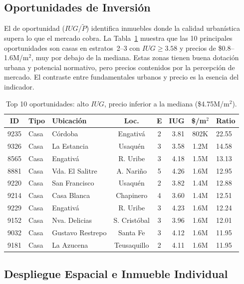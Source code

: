 \documentclass[12pt, a4paper, twoside, openright]{report}
\theoremstyle{plain}
\theoremstyle{definition}
\newcommand{\IUG}{IUG}             %
\begin{document}
\subsection{Oportunidades de Inversión}

El \ratio{} de oportunidad ($\IUG / \tilde{P}$) identifica inmuebles donde la calidad urbanística supera lo que el mercado cobra. La Tabla~\ref{tab:oportunidades_res} muestra que las 10 principales oportunidades son casas en estratos~2--3 con $\IUG \geq 3.58$ y precios de \$0.8--1.6M/m$^2$, muy por debajo de la mediana. Estas zonas tienen buena dotación urbana y potencial normativo, pero precios contenidos por la percepción de mercado. El contraste entre fundamentales urbanos y precio es la esencia del indicador.

\begin{table}[htbp]
\centering
\caption{Top 10 oportunidades: alto $\IUG$, precio inferior a la mediana (\$4.75M/m$^2$).}
\label{tab:oportunidades_res}
\small
\begin{tabular}{@{}cllccrcl@{}}
\toprule
\textbf{ID} & \textbf{Tipo} & \textbf{Ubicación} & \textbf{Loc.} & \textbf{E} &
$\boldsymbol{\IUG}$ & \textbf{\$/m$^2$} & \textbf{Ratio} \\
\midrule
9235 & Casa & Córdoba & Engativá & 2 & 3.81 & 802K & 22.55 \\
9326 & Casa & La Estancia & Usaquén & 3 & 3.58 & 1.2M & 14.58 \\
8565 & Casa & Engativá & R. Uribe & 3 & 4.18 & 1.5M & 13.13 \\
8881 & Casa & Vda. El Salitre & A. Nariño & 5 & 4.26 & 1.6M & 12.95 \\
9220 & Casa & San Francisco & Usaquén & 2 & 3.82 & 1.4M & 12.88 \\
9214 & Casa & Casa Blanca & Chapinero & 4 & 3.60 & 1.4M & 12.51 \\
9229 & Casa & Engativá & R. Uribe & 3 & 4.23 & 1.6M & 12.24 \\
9152 & Casa & Nva. Delicias & S. Cristóbal & 3 & 3.96 & 1.6M & 12.01 \\
9032 & Casa & Gustavo Restrepo & Santa Fe & 3 & 4.12 & 1.6M & 11.95 \\
9181 & Casa & La Azucena & Teusaquillo & 2 & 4.11 & 1.6M & 11.95 \\
\bottomrule
\end{tabular}
\end{table}


\subsection{Despliegue Espacial e Inmueble Individual}\label{subsec:despliegue_espacial}
\end{document}
